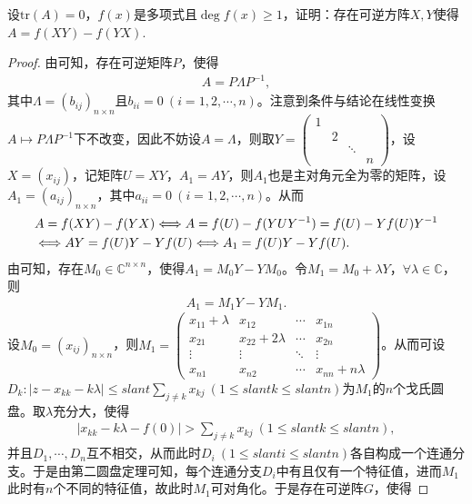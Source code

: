 \documentclass[../../main.tex]{subfiles}
\begin{document}
\begin{proposition}
设$\mathrm{tr}(A)=0$，$f(x)$是多项式且$\deg f(x)\geqslant  1$，证明：存在可逆方阵$X,Y$使得$A = f(XY)-f(YX)$.
\end{proposition}
\begin{proof}
由可知，存在可逆矩阵$P$，使得
\begin{align*}
A = P\Lambda P^{-1},
\end{align*}
其中$\Lambda = (b_{ij})_{n\times n}$且$b_{ii} = 0\ (i = 1,2,\cdots,n)$。注意到条件与结论在线性变换$A \mapsto P\Lambda P^{-1}$下不改变，因此不妨设$A = \Lambda$，则取$Y = \begin{pmatrix}
1 & & & \\
& 2 & & \\
& & \ddots & \\
& & & n
\end{pmatrix}$，设$X = (x_{ij})$，记矩阵$U = XY$，$A_1 = AY$，则$A_1$也是主对角元全为零的矩阵，设$A_1 = (a_{ij})_{n\times n}$，其中$a_{ii} = 0\ (i = 1,2,\cdots,n)$。从而
\begin{align}
&A = f(XY) - f(YX) \Longleftrightarrow A = f(U) - f(YUY^{-1}) = f(U) - Yf(U)Y^{-1} \notag \\
&\Longleftrightarrow AY = f(U)Y - Yf(U) \Longleftrightarrow A_1 = f(U)Y - Yf(U). \label{100.49}
\end{align}
由可知，存在$M_0 \in \mathbb{C}^{n\times n}$，使得$A_1 = M_0Y - YM_0$。令$M_1 = M_0 + \lambda Y$，$\forall \lambda \in \mathbb{C}$，则
\begin{align}
A_1 = M_1Y - YM_1. \label{100.48}
\end{align}
设$M_0 = (x_{ij})_{n\times n}$，则$M_1 = \begin{pmatrix}
x_{11} + \lambda & x_{12} & \cdots & x_{1n} \\
x_{21} & x_{22} + 2\lambda & \cdots & x_{2n} \\
\vdots & \vdots & \ddots & \vdots \\
x_{n1} & x_{n2} & \cdots & x_{nn} + n\lambda
\end{pmatrix}$。从而可设$D_k: |z - x_{kk} - k\lambda| \leqslant slant \sum_{j\ne k} x_{kj}\ (1 \leqslant slant k \leqslant slant n)$为$M_1$的$n$个戈氏圆盘。取$\lambda$充分大，使得
\begin{align}
|x_{kk} - k\lambda - f(0)| > \sum_{j\ne k} x_{kj}\ (1 \leqslant slant k \leqslant slant n), \label{100.46}
\end{align}
并且$D_1, \cdots, D_n$互不相交，从而此时$D_i\ (1 \leqslant slant i \leqslant slant n)$各自构成一个连通分支。于是由第二圆盘定理可知，每个连通分支$D_i$中有且仅有一个特征值，进而$M_1$此时有$n$个不同的特征值，故此时$M_1$可对角化。于是存在可逆阵$G$，使得

\end{proof}
\end{document}
